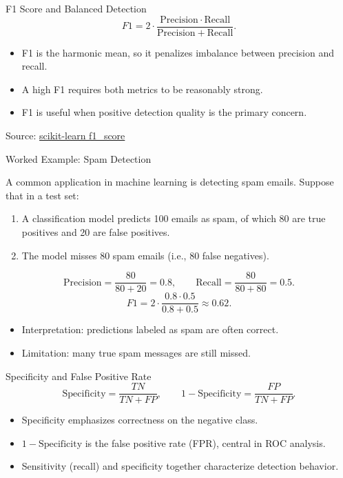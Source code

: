 \documentclass[10pt]{beamer}
\begin{document}
\begin{frame}{F1 Score and Balanced Detection}
  \justifying
  \[
    F1 = 2\cdot\frac{\mathrm{Precision}\cdot\mathrm{Recall}}{\mathrm{Precision}+\mathrm{Recall}}.
  \]
  \begin{itemize}
    \item F1 is the harmonic mean, so it penalizes imbalance between precision and recall.
    \item A high F1 requires both metrics to be reasonably strong.
    \item F1 is useful when positive detection quality is the primary concern.
  \end{itemize}
  \vspace{0.3em}
  {\footnotesize Source: \href{https://scikit-learn.org/stable/modules/generated/sklearn.metrics.f1_score.html}{scikit-learn f1\_score}}
\end{frame}

\begin{frame}{Worked Example: Spam Detection}
  \justifying

  A common application in machine learning is detecting spam emails. Suppose that in a test set:
\begin{enumerate}
    \item A classification model predicts 100 emails as spam, of which 80 are true positives and 20 are false positives.
    \item The model misses 80 spam emails (i.e., 80 false negatives).
\end{enumerate}

  \[
    \mathrm{Precision} = \frac{80}{80+20}=0.8, \qquad
    \mathrm{Recall} = \frac{80}{80+80}=0.5.
  \]
  \[
    F1 = 2\cdot\frac{0.8\cdot0.5}{0.8+0.5}\approx0.62.
  \]
  \begin{itemize}
    \item Interpretation: predictions labeled as spam are often correct.
    \item Limitation: many true spam messages are still missed.
  \end{itemize}
\end{frame}

\begin{frame}{Specificity and False Positive Rate}
  \justifying
  \[
    \mathrm{Specificity} = \frac{TN}{TN+FP}, \qquad
    1-\mathrm{Specificity} = \frac{FP}{TN+FP}.
  \]
  \begin{itemize}
    \item Specificity emphasizes correctness on the negative class.
    \item $1-\mathrm{Specificity}$ is the false positive rate (FPR), central in ROC analysis.
    \item Sensitivity (recall) and specificity together characterize detection behavior.
  \end{itemize}
\end{frame}
\end{document}
